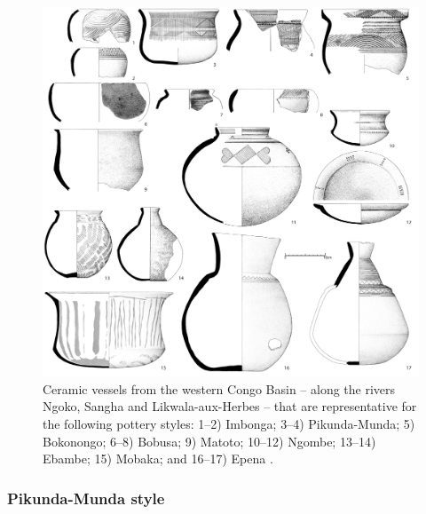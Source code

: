 \documentclass[smallextended,natbib]{svjour3}       %
\begin{document}
\begin{figure}[!tb]
	\includegraphics[width=\textwidth]{Sangha_Typen.pdf}
	\caption{Ceramic vessels from the western Congo Basin -- along the rivers Ngoko, Sangha and Likwala-aux-Herbes -- that are representative for the following pottery styles: 1--2) Imbonga; 3--4) Pikunda-Munda; 5) Bokonongo; 6--8) Bobusa; 9) Matoto; 10--12) Ngombe; 13--14) Ebambe; 15) Mobaka; and 16--17) Epena \citep[114--144, 162--172]{Seidensticker.2021e}.}
	\label{fig:sangha}
\end{figure}

\subsubsection*{Pikunda-Munda style}
\end{document}
